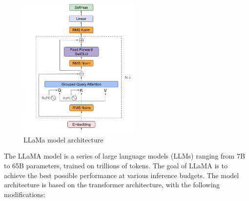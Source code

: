 \documentclass{article}
\begin{document}
		\begin{figure}[h]
			\centering
			\includegraphics[width=6cm]{llama}
			\caption{LLaMa model architecture}
		\end{figure}
		
		The LLaMA model is a series of large language models (LLMs) ranging from 7B to 65B parameters, trained on trillions of tokens. 
		The goal of LLaMA is to achieve the best possible performance at various inference budgets.
		The model architecture is based on the transformer architecture, with the following modifications:
		
\end{document}
